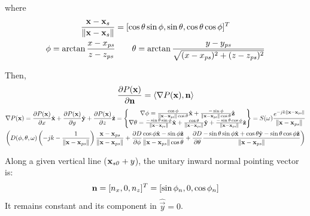 where
\begin{gather}
	\frac{\PosTheo - \PosTheo[surface]}{\norm{\PosTheo - \PosTheo[surface]}} = [\cos{\elevation} \sin\azimuth, \sin\elevation, \cos\elevation \cos\azimuth]^T \\
	\azimuth = \arctan \frac{x - x_{\PosTheoSubInd[primarySource]}}{z - z_{\PosTheoSubInd[primarySource]}} \qquad \elevation = \arctan{\frac{y - y_{\PosTheoSubInd[primarySource]}}{\sqrt{(x - x_{\PosTheoSubInd[primarySource]})^2 + (z - z_{\PosTheoSubInd[primarySource]})^2}}} 
\end{gather}

Then,
\begin{equation}
\frac{\partial P(\PosTheo)}{\partial \mathbf{n}} = \langle \nabla P(\PosTheo), \vec{n} \rangle
\end{equation}
\begin{multline}
\nabla P(\PosTheo) = \frac{\partial P(\PosTheo)}{\partial x} \hat{\vec{x}} + \frac{\partial P(\PosTheo)}{\partial y} \hat{\vec{y}} + \frac{\partial P(\PosTheo)}{\partial z} \hat{\vec{z}} =
\left\{ \begin{matrix}
\nabla \azimuth = \frac{\cos\azimuth}{\norm{\PosTheo - \PosTheo[primarySource]} \cos \elevation} \hat{\vec{x}} +
\frac{-\sin \azimuth}{\norm{\PosTheo - \PosTheo[primarySource]} \cos \elevation} \hat{\vec{z}} \\
\nabla \elevation = \frac{-\sin \elevation \sin \azimuth}{\norm{\PosTheo - \PosTheo[primarySource]}} \hat{\vec{x}} + \frac{\cos \elevation}{\norm{\PosTheo - \PosTheo[primarySource]}} \hat{\vec{y}} + \frac{-\sin \elevation \cos \azimuth}{\norm{\PosTheo - \PosTheo[primarySource]}} \hat{\vec{z}}
\end{matrix} \right\}
= S(\omega) \GreenFunc[{\PosTheo - \PosTheo[primarySource]}]
\\ \left(D(\azimuth, \elevation, \omega)
\left(-jk - \frac{1}{\norm{\PosTheo - \PosTheo[primarySource]}}\right) \frac{\PosTheo - \PosTheo[primarySource]}{\norm{\PosTheo - \PosTheo[primarySource]}} +
\frac{\partial D}{\partial \azimuth} \frac{\cos \azimuth \hat{\vec{x}} - \sin \azimuth \hat{\vec{z}}}{\norm{\PosTheo - \PosTheo[primarySource]} \cos \elevation} + \frac{\partial D}{\partial \elevation} \frac{-\sin\elevation \sin\azimuth \hat{\vec{x}} + \cos\elevation \hat{\vec{y}} - \sin\elevation \cos\azimuth \hat{\vec{z}}}{\norm{\PosTheo - \PosTheo[primarySource]}} \right)
\end{multline}

Along a given vertical line ($\PosTheo[section] + y$), the unitary inward normal pointing vector is:
\begin{equation}
\mathbf{n} = [n_x, 0, n_z]^T = [\sin\phi_n, 0, \cos\phi_n]
\end{equation}
It remains constant and its component in $\hat{\vec{y}} = 0$.

